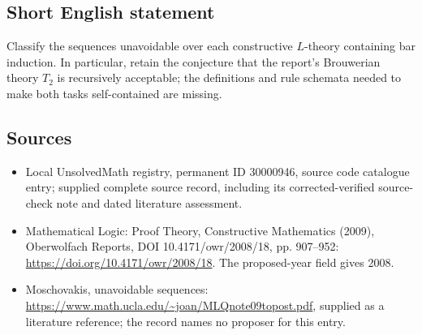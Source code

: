 \documentclass[11pt]{article}
\begin{document}
\subsection{Short English statement}
Classify the sequences unavoidable over each constructive $L$-theory containing bar induction. In particular, retain the conjecture that the report's Brouwerian theory $T_2$ is recursively acceptable; the definitions and rule schemata needed to make both tasks self-contained are missing.
\subsection{Sources}
\begin{itemize}
\item Local UnsolvedMath registry, permanent ID 30000946, source code catalogue entry; supplied complete source record, including its corrected-verified source-check note and dated literature assessment.
\item Mathematical Logic: Proof Theory, Constructive Mathematics (2009), Oberwolfach Reports, DOI 10.4171/owr/2008/18, pp. 907--952: \url{https://doi.org/10.4171/owr/2008/18}. The proposed-year field gives 2008.
\item Moschovakis, unavoidable sequences: \url{https://www.math.ucla.edu/~joan/MLQnote09topost.pdf}, supplied as a literature reference; the record names no proposer for this entry.
\end{itemize}
\end{document}
